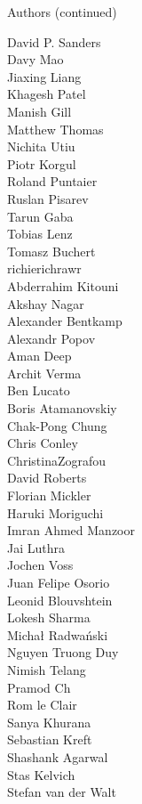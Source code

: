 \begin{frame}{Authors (continued)}
\begin{multicols}{5}
\tiny
David P. Sanders\\
Davy Mao\\
Jiaxing Liang\\
Khagesh Patel\\
Manish Gill\\
Matthew Thomas\\
Nichita Utiu\\
Piotr Korgul\\
Roland Puntaier\\
Ruslan Pisarev\\
Tarun Gaba\\
Tobias Lenz\\
Tomasz Buchert\\
richierichrawr\\
Abderrahim Kitouni\\
Akshay Nagar\\
Alexander Bentkamp\\
Alexandr Popov\\
Aman Deep\\
Archit Verma\\
Ben Lucato\\
Boris Atamanovskiy\\
Chak-Pong Chung\\
Chris Conley\\
ChristinaZografou\\
David Roberts\\
Florian Mickler\\
Haruki Moriguchi\\
Imran Ahmed Manzoor\\
Jai Luthra\\
Jochen Voss\\
Juan Felipe Osorio\\
Leonid Blouvshtein\\
Lokesh Sharma\\
Michał Radwański\\
Nguyen Truong Duy\\
Nimish Telang\\
Pramod Ch\\
Rom le Clair\\
Sanya Khurana\\
Sebastian Kreft\\
Shashank Agarwal\\
Stas Kelvich\\
Stefan van der Walt\\

\end{multicols}
\end{frame}
